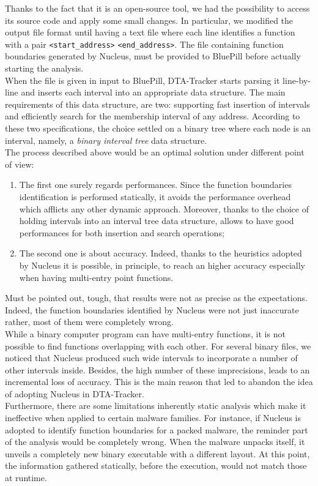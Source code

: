 \documentclass[LaM,binding=0.6cm]{sapthesis}
\begin{document}
Thanks to the fact that it is an open-source tool, we had the possibility to access its source code and apply some small changes. In particular, we modified the output file format until having a text file where each line identifies a function with a pair \texttt{<start\_address>} \texttt{<end\_address>}. The file containing function boundaries generated by Nucleus, must be provided to BluePill before actually starting the analysis.\\
When the file is given in input to BluePill, DTA-Tracker starts parsing it line-by-line and inserts each interval into an appropriate data structure. The main requirements of this data structure, are two: supporting fast insertion of intervals and efficiently search for the membership interval of any address. According to these two specifications, the choice settled on a binary tree where each node is an interval, namely, a \textit{binary interval tree} data structure.\\ 
The process described above would be an optimal solution under different point of view:
\begin{enumerate}
\item The first one surely regards performances. Since the function boundaries identification is performed statically, it avoids the performance overhead which afflicts any other dynamic approach. Moreover, thanks to the choice of holding intervals into an interval tree data structure, allows to have good performances for both insertion and search operations;
\item The second one is about accuracy. Indeed, thanks to the heuristics adopted by Nucleus it is possible, in principle, to reach an higher accuracy especially when having multi-entry point functions.
\end{enumerate}
Must be pointed out, tough, that results were not as precise as the expectations. Indeed, the function boundaries identified by Nucleus were not just inaccurate rather, most of them were completely wrong.\\

While a binary computer program can have multi-entry functions, it is not possible to find functions overlapping with each other. For several binary files, we noticed that Nucleus produced such wide intervals to incorporate a number of other intervals inside. Besides, the high number of these imprecisions, leads to an incremental loss of accuracy. This is the main reason that led to abandon the idea of adopting Nucleus in DTA-Tracker.\\
Furthermore, there are some limitations inherently static analysis which make it ineffective when applied to certain malware families. For instance, if Nucleus is adopted to identify function boundaries for a packed malware, the reminder part of the analysis would be completely wrong. When the malware unpacks itself, it unveils a completely new binary executable with a different layout. At this point, the information gathered statically, before the execution, would not match those at runtime.
\end{document}
